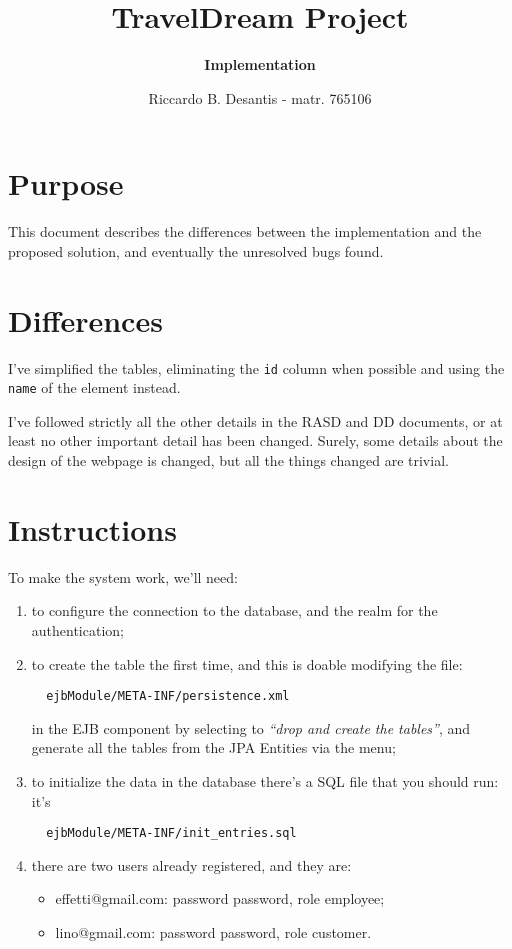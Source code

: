 \documentclass[a4paper,12pt]{article}
\begin{document}
\title{\textbf{TravelDream Project}}
\author{\textbf{Implementation}}
\date{Riccardo B. Desantis - matr. 765106}

\maketitle

\section{Purpose}
This document describes the differences between the implementation and the proposed solution, and eventually the unresolved bugs found.

\section{Differences}
I've simplified the tables, eliminating the \texttt{id} column when possible and using the \texttt{name} of the element instead.\newline

I've followed strictly all the other details in the RASD and DD documents, or at least no other important detail has been changed. Surely, some details about the design of the webpage is changed, but all the things changed are trivial.

\section{Instructions}
To make the system work, we'll need:
\begin{enumerate}
  \item to configure the connection to the database, and the realm for the authentication;
  \item to create the table the first time, and this is doable modifying the file:
  \begin{verbatim}
  ejbModule/META-INF/persistence.xml\end{verbatim}
  in the EJB component by selecting to \textit{``drop and create the tables''}, and generate all the tables from the JPA Entities via the menu;
  \item to initialize the data in the database there's a SQL file that you should run: it's
  \begin{verbatim}
  ejbModule/META-INF/init_entries.sql\end{verbatim}
  \item there are two users already registered, and they are:
  \begin{itemize}
    \item effetti@gmail.com: password password, role employee;
    \item lino@gmail.com: password password, role customer.
  \end{itemize}
\end{enumerate}
\end{document}

